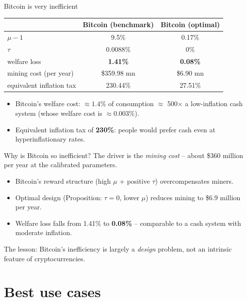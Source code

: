 \documentclass[aspectratio=169,xcolor=dvipsnames]{beamer}
\begin{document}
\begin{frame}{Bitcoin is very inefficient}
    \centering
    \small
    \begin{tabular}{lcc}
        \hline
        & Bitcoin (benchmark) & Bitcoin (optimal) \\
        \hline
        $\mu - 1$ & 9.5\% & 0.17\% \\
        $\tau$ & 0.0088\% & 0\% \\
        welfare loss & \textbf{1.41\%} & \textbf{0.08\%} \\
        mining cost (per year) & \$359.98 mn & \$6.90 mn \\
        equivalent inflation tax & 230.44\% & 27.51\% \\
        \hline
    \end{tabular}
    \vspace{4mm}
    \begin{itemize}
        \item Bitcoin's welfare cost: $\approx 1.4\%$ of consumption $\approx$ 500$\times$ a low-inflation
              cash system (whose welfare cost is $\approx 0.003\%$).
        \item Equivalent inflation tax of \textbf{230\%}: people would prefer cash even at
              hyperinflationary rates.
    \end{itemize}
\end{frame}

\begin{frame}{Why is Bitcoin so inefficient?}
    The driver is the \emph{mining cost} -- about \$360 million per year at the calibrated parameters.
    \vspace{3mm}
    \begin{itemize}
        \item Bitcoin's reward structure (high $\mu$ + positive $\tau$) overcompensates miners.
        \item Optimal design (Proposition: $\tau=0$, lower $\mu$) reduces mining to
              \$6.9 million per year.
        \item Welfare loss falls from 1.41\% to \textbf{0.08\%} -- comparable to a cash system with
              moderate inflation.
    \end{itemize}
    \vspace{3mm}
    The lesson: Bitcoin's inefficiency is largely a \emph{design} problem, not an
    intrinsic feature of cryptocurrencies.
\end{frame}

\section{Best use cases}
\end{document}
